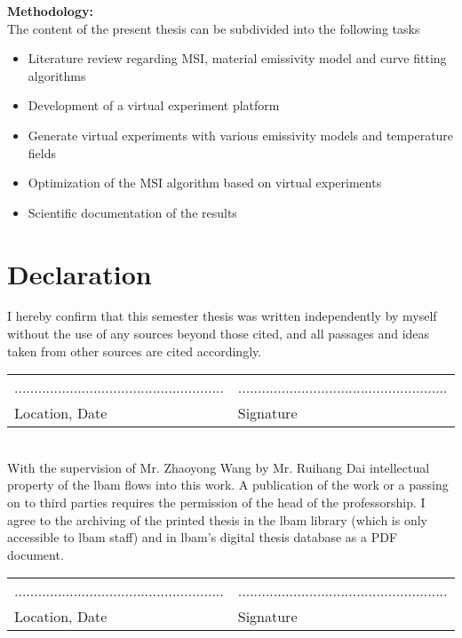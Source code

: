 \textbf{Methodology:} \\
The content of the present thesis can be subdivided into the following tasks
\begin{itemize}
	\item Literature review regarding MSI, material emissivity model and curve fitting 
	algorithms
	\item Development of a virtual experiment platform
	\item Generate virtual experiments with various emissivity models and temperature fields
	\item Optimization of the MSI algorithm based on virtual experiments
	\item Scientific documentation of the results
\end{itemize}

\chapter*{Declaration}
I hereby confirm that this semester thesis was written independently 
by myself without the use of any sources beyond those cited, and all
passages and ideas taken from other sources are cited accordingly.%
%
\vspace{5cm}\\
\begin{tabular}{p{0.5\linewidth}p{0.5\linewidth} }
	.....................................................		& .....................................................\\
	Location, Date  	& Signature
\end{tabular}
%
\vspace{2cm}\\
%
With the supervision of Mr. Zhaoyong Wang by Mr. Ruihang Dai intellectual property of the \gls{lbam}  flows into this work. A publication of the work or a passing on to third parties requires the permission of the head of the professorship. I agree to the archiving of the printed thesis in the  \gls{lbam} library (which is only accessible to \gls{lbam} staff) and in \gls{lbam}'s digital thesis database as a PDF document.%
%
\vfill
%
\begin{tabular}{p{0.5\linewidth}p{0.5\linewidth} }
	.....................................................		& .....................................................\\
    Location, Date  	& Signature
\end{tabular}

